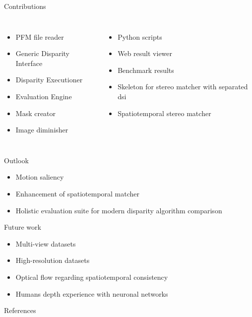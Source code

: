 \documentclass[10pt]{beamer}
\begin{document}
\begin{frame}[fragile]{Contributions}
  \begin{columns}[T,onlytextwidth]
    \begin{itemize}
      \item PFM file reader
      \item Generic Disparity Interface
      \item Disparity Executioner
      \item Evaluation Engine
      \item Mask creator
      \item Image diminisher
    \end{itemize}
    \begin{itemize}
      \item Python scripts
      \item Web result viewer
      \item Benchmark results
      \item Skeleton for stereo matcher with separated dsi
      \item Spatiotemporal stereo matcher
    \end{itemize}
  \end{columns}
\end{frame}

\begin{frame}[fragile]{Outlook}
  \begin{itemize}
    \item Motion saliency
    \item Enhancement of spatiotemporal matcher
    \item Holistic evaluation suite for modern disparity algorithm comparison
  \end{itemize}
\end{frame}

\begin{frame}[fragile]{Future work}
  \begin{itemize}
    \item Multi-view datasets
    \item High-resolution datasets
    \item Optical flow regarding spatiotemporal consistency
    \item Humans depth experience with neuronal networks
  \end{itemize}
\end{frame}


\begin{frame}[allowframebreaks]{References}

  
  

\end{frame}
\end{document}
